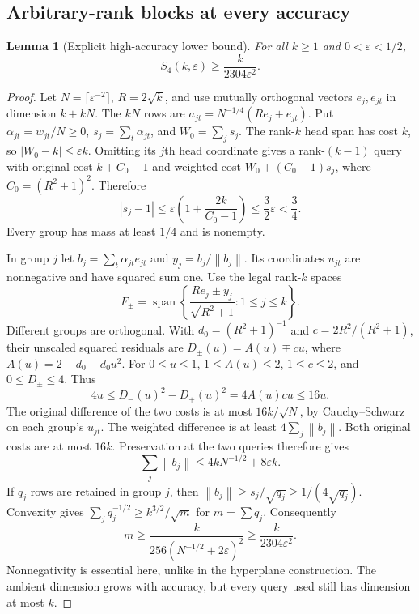 \documentclass[11pt]{article}
\newtheorem{lemma}[theorem]{Lemma}
\theoremstyle{remark}\newtheorem{remark}[theorem]{Remark}
\newcommand{\norm}[1]{\left\lVert#1\right\rVert}\newcommand{\abs}[1]{\left|#1\right|}
\numberwithin{equation}{section}
\begin{document}
\subsection{Arbitrary-rank blocks at every accuracy}
\begin{lemma}[Explicit high-accuracy lower bound]\label{lem:blocklower}
For all $k\ge1$ and $0<\varepsilon<1/2$,
\begin{equation}\label{eq:blocklower}
 S_4(k,\varepsilon)\ge\frac{k}{2304\varepsilon^2}.
\end{equation}
\end{lemma}
\begin{proof}
Let $N=\lceil\varepsilon^{-2}\rceil$, $R=2\sqrt k$, and use mutually orthogonal vectors $e_j,e_{jt}$ in dimension $k+kN$. The $kN$ rows are
$a_{jt}=N^{-1/4}(Re_j+e_{jt})$. Put $\alpha_{jt}=w_{jt}/N\ge0$, $s_j=\sum_t\alpha_{jt}$, and $W_0=\sum_j s_j$.
The rank-$k$ head span has cost $k$, so $|W_0-k|\le\varepsilon k$. Omitting its $j$th head coordinate gives a rank-$(k-1)$ query with original cost $k+C_0-1$ and weighted cost $W_0+(C_0-1)s_j$, where $C_0=(R^2+1)^2$. Therefore
\[
 |s_j-1|\le\varepsilon\left(1+\frac{2k}{C_0-1}\right)
 \le\frac32\varepsilon<\frac34.
\]
Every group has mass at least $1/4$ and is nonempty.

In group $j$ let $b_j=\sum_t\alpha_{jt}e_{jt}$ and $y_j=b_j/\norm{b_j}$. Its coordinates $u_{jt}$ are nonnegative and have squared sum one. Use the legal rank-$k$ spaces
\[
 F_\pm=\operatorname{span}\left\{\frac{Re_j\pm y_j}{\sqrt{R^2+1}}:1\le j\le k\right\}.
\]
Different groups are orthogonal. With $d_0=(R^2+1)^{-1}$ and $c=2R^2/(R^2+1)$, their unscaled squared residuals are
$D_\pm(u)=A(u)\mp cu$, where $A(u)=2-d_0-d_0u^2$. For $0\le u\le1$, $1\le A(u)\le2$, $1\le c\le2$, and $0\le D_\pm\le4$. Thus
\[
 4u\le D_-(u)^2-D_+(u)^2=4A(u)cu\le16u.
\]
The original difference of the two costs is at most $16k/\sqrt N$, by Cauchy--Schwarz on each group's $u_{jt}$. The weighted difference is at least $4\sum_j\norm{b_j}$. Both original costs are at most $16k$. Preservation at the two queries therefore gives
\[
 \sum_j\norm{b_j}\le4kN^{-1/2}+8\varepsilon k.
\]
If $q_j$ rows are retained in group $j$, then $\norm{b_j}\ge s_j/\sqrt{q_j}\ge1/(4\sqrt{q_j})$. Convexity gives
$\sum_jq_j^{-1/2}\ge k^{3/2}/\sqrt m$ for $m=\sum q_j$. Consequently
\[
 m\ge\frac{k}{256(N^{-1/2}+2\varepsilon)^2}
 \ge\frac{k}{2304\varepsilon^2}.
\]
Nonnegativity is essential here, unlike in the hyperplane construction. The ambient dimension grows with accuracy, but every query used still has dimension at most $k$.
\end{proof}
\end{document}
